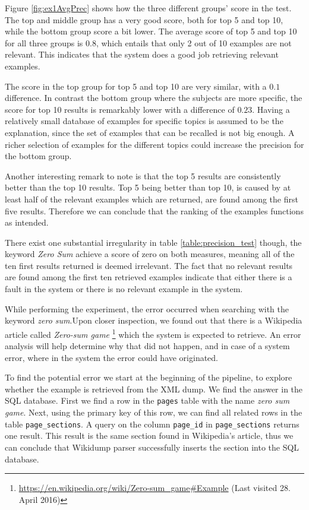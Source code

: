 Figure \ref{fig:ex1AvgPrec} shows how the three different groups' score in the test. The top and middle group has a very good score, both for top 5 and top 10, while the bottom group score a bit lower. The average score of top 5 and top 10 for all three groups is \(0.8\), which entails that only 2 out of 10 examples are not relevant. This indicates that the system does a good job retrieving relevant examples.

The score in the top group for top 5 and top 10 are very similar, with a \(0.1\) difference. In contrast the bottom group where the subjects are more specific, the score for top 10 results is remarkably lower with a difference of \(0.23\). Having a relatively small database of examples for specific topics is assumed to be the explanation, since the set of examples that can be recalled is not big enough. A richer selection of examples for the different topics could increase the precision for the bottom group. 

Another interesting remark to note is that the top 5 results are consistently better than the top 10 results. Top 5 being better than top 10, is caused by at least half of the relevant examples which are returned, are found among the first five results. Therefore we can conclude that the ranking of the examples functions as intended. 

There exist one substantial irregularity in table \ref{table:precision_test} though, the keyword \textit{Zero Sum} achieve a score of zero on both measures, meaning all of the ten first results returned is deemed irrelevant. The fact that no relevant results are found among the first ten retrieved examples indicate that either there is a fault in the system or there is no relevant example in the system.

While performing the experiment, the error occurred when searching with the keyword \textit{zero sum}.Upon closer inspection, we found out that there is a Wikipedia article called \textit{Zero-sum game} \footnote{\url{https://en.wikipedia.org/wiki/Zero-sum\_game\#Example} (Last visited 28. April 2016)} which the system is expected to retrieve. An error analysis will help determine why that did not happen, and in case of a system error, where in the system the error could have originated. 

To find the potential error we start at the beginning of the pipeline, to explore whether the example is retrieved from the XML dump. We find the answer in the SQL database. First we find a row in the \texttt{pages} table with the name \textit{zero sum game}. Next, using the primary key of this row, we can find all related rows in the table \texttt{page\_sections}. A query on the column \texttt{page\_id} in \texttt{page\_sections} returns one result. This result is the same section found in Wikipedia's article, thus we can conclude that Wikidump parser successfully inserts the section into the SQL database.

